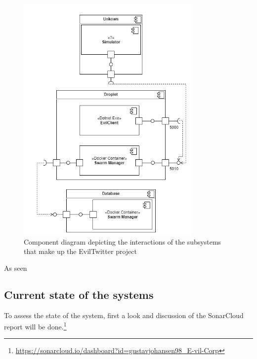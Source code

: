 \documentclass[report/main.tex]{subfiles}
\begin{document}
        \begin{figure}[H]
            \centering
            \includegraphics[width=0.8\textwidth]{report/images/EvilTwitter-Component Diagram - Evil Corp.jpg}
            \caption{Component diagram depicting the interactions of the subsystems that make up the EvilTwitter project}
            \label{fig:component-diagram}
        \end{figure}
        
        As seen 
    
    \subsection{Current state of the systems}
    \label{subsec:current-state-of-the-system}
        To assess the state of the system, first a look and discussion of the SonarCloud report will be done.\footnote{\hyperlink{https://sonarcloud.io/dashboard?id=gustavjohansen98_E-vil-Corp}{https://sonarcloud.io/dashboard?id=gustavjohansen98\_E-vil-Corp}}
        
\end{document}
